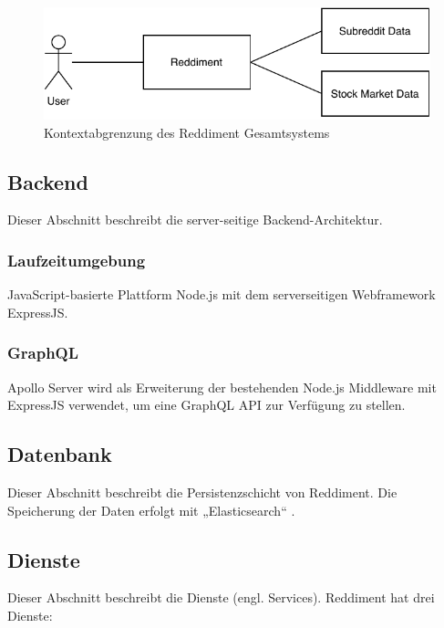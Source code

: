 \documentclass[a4paper, 10pt, conference]{IEEEtran}
\begin{document}
\begin{figure}[ht]
	\centering
	\includegraphics[width=\linewidth]{context}
	\caption{Kontextabgrenzung des Reddiment Gesamtsystems}
	\label{fig:context}
\end{figure}

\subsection{Backend} \label{sub:backend}
Dieser Abschnitt beschreibt die server-seitige Backend-Architektur.

\subsubsection{Laufzeitumgebung}

JavaScript-basierte Plattform Node.js mit dem serverseitigen Webframework ExpressJS.

\subsubsection{GraphQL}

Apollo Server wird als Erweiterung der bestehenden Node.js Middleware mit ExpressJS verwendet, um eine GraphQL API zur Verfügung zu stellen.

\subsection{Datenbank} \label{sub:database}

Dieser Abschnitt beschreibt die Persistenzschicht von Reddiment.  Die Speicherung der Daten erfolgt mit „Elasticsearch“ \cite{elasticsearch}.

\subsection{Dienste} \label{sub:services}

Dieser Abschnitt beschreibt die Dienste (engl. Services). Reddiment hat drei Dienste: 
\end{document}
